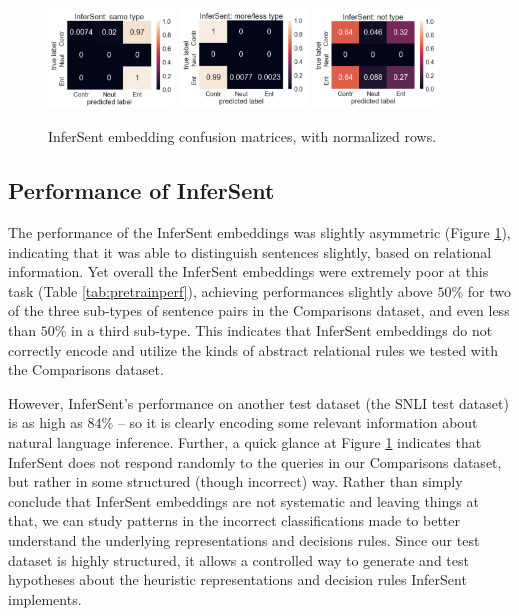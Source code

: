 \begin{figure}[ht!]
\centering
\includegraphics[width=0.30\textwidth]{figures/infersent-same-large-2}
\includegraphics[width=0.30\textwidth]{figures/infersent-ml-large-2}
\includegraphics[width=0.30\textwidth]{figures/infersent-not-large}

\caption{InferSent embedding confusion matrices, with normalized rows.}
\label{fig:InferSenthist}
\end{figure}

\subsection{Performance of InferSent}
The performance of the InferSent embeddings was slightly asymmetric (Figure \ref{fig:InferSenthist}), indicating that it was able to distinguish sentences slightly, based on relational information. Yet overall the InferSent embeddings were extremely poor at this task (Table \ref{tab:pretrainperf}), achieving performances slightly above $50\%$ for two of the three sub-types of sentence pairs in the Comparisons dataset, and even less than $50\%$ in a third sub-type. This indicates that InferSent embeddings do not correctly encode and utilize the kinds of abstract relational rules we tested with the Comparisons dataset. 

However, InferSent's performance on another test dataset (the SNLI test dataset) is as high as $84\%$ -- so it is clearly encoding some relevant information about natural language inference. Further, a quick glance at Figure \ref{fig:InferSenthist} indicates that InferSent does not respond randomly to the queries in our Comparisons dataset, but rather in some structured (though incorrect) way. Rather than simply conclude that InferSent embeddings are not systematic and leaving things at that, we can study patterns in the incorrect classifications made to better understand the underlying representations and decisions rules. Since our test dataset is highly structured, it allows a controlled way to generate and test hypotheses about the heuristic representations and decision rules InferSent implements. 

